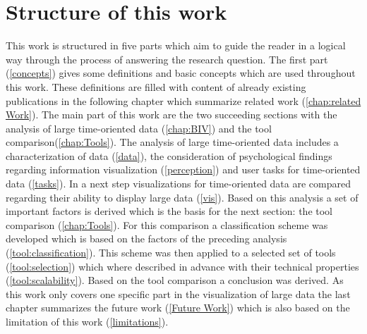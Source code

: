 \section{Structure of this work}
This work is structured in five parts which aim to guide the reader in a logical way through the process of answering the research question. The first part (\ref{concepts}) gives some definitions and basic concepts which are used throughout this work. These definitions are filled with content of already existing publications in the following chapter which summarize related work (\ref{chap:related Work}). The main part of this work are the two succeeding sections with the analysis of large time-oriented data (\ref{chap:BIV}) and the tool comparison(\ref{chap:Tools}). The analysis of large time-oriented data includes a characterization of data (\ref{data}), the consideration of psychological findings regarding information visualization  (\ref{perception}) and user tasks for time-oriented data (\ref{tasks}). In a next step visualizations for time-oriented data are compared regarding their ability to display large data (\ref{vis}). Based on this analysis a set of important factors is derived which is the basis for the next section: the tool comparison (\ref{chap:Tools}). For this comparison a  classification scheme was developed which is based on the factors of the preceding analysis (\ref{tool:classification}). This scheme was then applied to a selected set of tools (\ref{tool:selection}) which where described in advance with their technical properties (\ref{tool:scalability}).
Based on the tool comparison a conclusion was derived. 
As this work only covers one specific part in the visualization of large data the last chapter summarizes the future work (\ref{Future Work}) which is also based on the limitation of this work (\ref{limitations}).